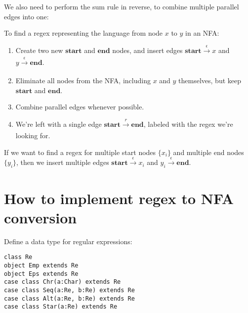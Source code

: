 \documentclass[a4paper, 11pt]{article}
\theoremstyle{definition}
\begin{document}
\noindent We also need to perform the sum rule in reverse, to combine multiple parallel edges into one:

\begin{center}
\end{center}

\noindent To find a regex representing the language from node $x$ to $y$ in an NFA:\bigskip

\begin{enumerate}
  \item Create two new $\mathbf{start}$ and $\mathbf{end}$ nodes, and insert edges $\mathbf{start} \xrightarrow[]{\epsilon} x$ and $y \xrightarrow[]{\epsilon} \mathbf{end}$.
  \item Eliminate all nodes from the NFA, including $x$ and $y$ themselves, but keep $\mathbf{start}$ and $\mathbf{end}$.
  \item Combine parallel edges whenever possible.
  \item We're left with a single edge $\mathbf{start} \xrightarrow[]{r} \mathbf{end}$, labeled with the regex we're looking for.
\end{enumerate}

\bigskip

\noindent If we want to find a regex for multiple start nodes $\{x_i\}$ and multiple end nodes $\{y_i\}$, then we insert multiple edges $\mathbf{start} \xrightarrow[]{\epsilon} x_i$ and $y_i \xrightarrow[]{\epsilon} \mathbf{end}$.

\section{How to implement regex to NFA conversion}

Define a data type for regular expressions:

\begin{lstlisting}
class Re
object Emp extends Re
object Eps extends Re
case class Chr(a:Char) extends Re
case class Seq(a:Re, b:Re) extends Re
case class Alt(a:Re, b:Re) extends Re
case class Star(a:Re) extends Re
\end{lstlisting}
\end{document}
